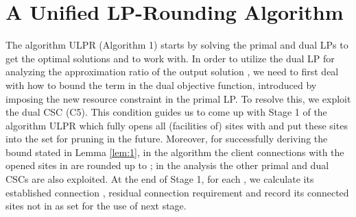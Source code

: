 \documentclass[10pt]{llncs}
\begin{document}
\section{A Unified LP-Rounding Algorithm}

The algorithm ULPR (Algorithm 1) starts by solving the primal and
dual LPs to get the optimal solutions 
and 
to work with. In order to utilize the dual LP for analyzing the approximation
ratio of the output solution ,
we need to first deal with how to bound the 
term in the dual objective function, introduced by imposing the new
resource constraint 
in the primal LP. To resolve this, we exploit the dual CSC (C5). This
condition guides us to come up with Stage 1 of the algorithm ULPR
which fully opens all (facilities of) sites with 
and put these sites into the set  for pruning in the
future. Moreover, for successfully deriving the bound stated in Lemma
\ref{lem:1}, in the algorithm the client connections 
with the opened sites in  are rounded up to ;
in the analysis the other primal and dual CSCs are also exploited.
At the end of Stage 1, for each , we calculate its established
connection , residual connection requirement 
and record its connected sites not in  as set 
for the use of next stage.
\end{document}

